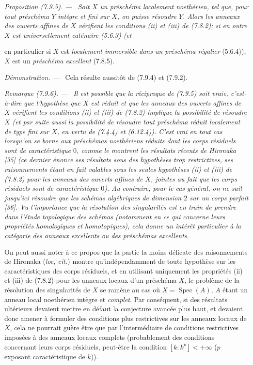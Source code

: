 \documentclass[10pt,oneside]{book}
\newcommand{\oldpage}[2][]{%
  \setcounter{footnote}{0}%
  \marginpar{\scriptsize\textbf{#1}~|~#2}\ignorespaces}
\newenvironment{proposition}[1][]{%
  \par\medskip\noindent\itshape Proposition (#1). ---\ }{\par}
\newenvironment{remark}[1][]{%
  \par\medskip\noindent\itshape Remarque (#1). ---\ }{\par}
\newenvironment{proof}{%
  \par\medskip\noindent\textit{Démonstration. ---\ }}{\par}
\begin{document}
\begin{proposition}[7.9.5]
\label{IV.2.s7.9.5-fr}
Soit $X$ un préschéma localement noethérien, tel que, pour tout préschéma $Y$
intègre et fini sur $X$, on puisse résoudre $Y$. Alors les anneaux des ouverts
affines de $X$ vérifient les conditions (ii) et (iii) de (7.8.2); si en outre
$X$ est universellement caténaire (5.6.3) (et

\oldpage[IV-2]{220}

en particulier si $X$ est \emph{localement immersible dans un préschéma
régulier} (5.6.4)), $X$ est un \emph{préschéma excellent} (7.8.5).
\end{proposition}

\begin{proof}
Cela résulte aussitôt de (7.9.4) et (7.9.2).
\end{proof}

\begin{remark}[7.9.6]
\label{IV.2.s7.9.6-fr}
Il est possible que la réciproque de (7.9.5) soit vraie, c'est-à-dire que
l'hypothèse que $X$ est réduit et que les anneaux des ouverts affines de $X$
vérifient les conditions (ii) et (iii) de (7.8.2) implique la possibilité de
résoudre $X$ (et par suite aussi la possibilité de résoudre tout préschéma
réduit localement de type fini sur $X$, en vertu de (7.4.4) et (6.12.4)).
C'est vrai en tout cas lorsqu'on se borne aux préschémas noethériens réduits
dont les corps résiduels sont de \emph{caractéristique} $0$, comme le montrent
les résultats récents de Hironaka [35] (ce dernier énonce ses résultats sous
des hypothèses trop restrictives, ses raisonnements étant en fait valables
sous les seules hypothèses (ii) et (iii) de (7.8.2) pour les anneaux des
ouverts affines de $X$, jointes au fait que les corps résiduels sont de
caractéristique $0$). Au contraire, pour le cas général, on ne sait jusqu'ici
résoudre que les schémas algébriques de dimension $2$ sur un corps parfait
[36]. Vu l'importance que la résolution des singularités est en train de
prendre dans l'étude topologique des schémas (notamment en ce qui concerne
leurs propriétés homologiques et homotopiques), cela donne un intérêt
particulier à la catégorie des anneaux excellents ou des préschémas
excellents.

On peut aussi noter à ce propos que la partie la moins délicate des
raisonnements de Hironaka (\emph{loc, cit.}) montre qu'indépendamment de toute
hypothèse sur les caractéristiques des corps résiduels, et en utilisant
uniquement les propriétés (ii) et (iii) de (7.8.2) pour les anneaux locaux
d'un préschéma $X$, le problème de la résolution des singularités de $X$ se
ramène au cas où $X=\operatorname{Spec}(A)$, $A$ étant un anneau local
noethérien intègre et \emph{complet}. Par conséquent, si des résultats
ultérieurs devaient mettre en défaut la conjecture avancée plus haut, et
devaient donc amener à formuler des conditions plus restrictives sur les
anneaux locaux de $X$, cela ne pourrait guère être que par l'intermédiaire de
conditions restrictives imposées à des anneaux locaux complets (probablement
des conditions concernant leurs corps résiduels, peut-être la condition
$[k:k^p]<+\infty$ ($p$ exposant caractéristique de $k$)).
\end{remark}
\end{document}
